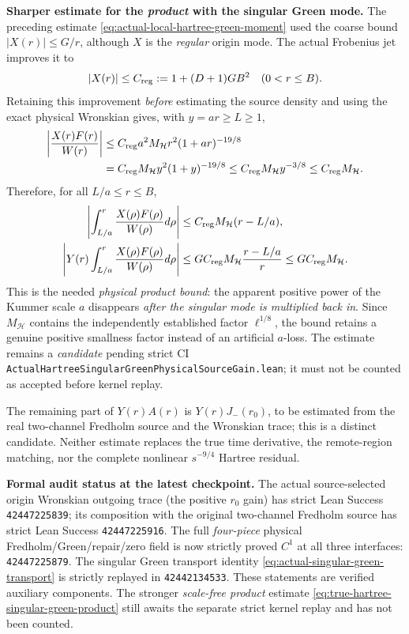 \documentclass[11pt]{amsart}
\newcommand{\HH}{\mathcal H}
\begin{document}
\medskip
\noindent\textbf{Sharper estimate for the \emph{product} with the singular Green mode.}
The preceding estimate \eqref{eq:actual-local-hartree-green-moment}
used the coarse bound $|X(r)|\le G/r$, although $X$ is the
\emph{regular} origin mode. The actual Frobenius jet improves it to
\[
 |X(r)|\le C_{\rm reg}:=1+(D+1)G B^2
 \quad(0<r\le B).
\]
Retaining this improvement \emph{before} estimating the source
density and using the exact physical Wronskian gives, with $y=ar\ge L\ge1$,
\begin{align*}
 \left|\frac{X(r)F(r)}{W(r)}\right|
 &\le C_{\rm reg}a^2 M_{\HH}r^2(1+ar)^{-19/8}\\
 &=C_{\rm reg}M_{\HH}y^2(1+y)^{-19/8}
 \le C_{\rm reg}M_{\HH}y^{-3/8}
 \le C_{\rm reg}M_{\HH}.
\end{align*}
Therefore, for all $L/a\le r\le B$,
\begin{align}
 \left|\int_{L/a}^r\frac{X(\rho)F(\rho)}{W(\rho)}d\rho\right|
 &\le C_{\rm reg}M_{\HH}(r-L/a),\\
 \left|Y(r)\int_{L/a}^r
     \frac{X(\rho)F(\rho)}{W(\rho)}d\rho\right|
 &\le G C_{\rm reg}M_{\HH}\frac{r-L/a}{r}
 \le G C_{\rm reg}M_{\HH}.
 \label{eq:true-hartree-singular-green-product}
\end{align}
This is the needed \emph{physical product bound}: the apparent positive
power of the Kummer scale $a$ disappears \emph{after the singular mode
is multiplied back in}. Since $M_{\HH}$ contains the independently
established factor $\ell^{1/8}$, the bound retains a genuine
positive smallness factor instead of an artificial $a$-loss.
The estimate remains a \emph{candidate} pending strict CI
\texttt{ActualHartreeSingularGreenPhysicalSourceGain.lean};
it must not be counted as accepted before kernel replay.

The remaining part of $Y(r)A(r)$ is $Y(r)J_-(r_0)$,
to be estimated from the real two-channel Fredholm source and the
Wronskian trace; this is a distinct candidate. Neither estimate
replaces the true time derivative, the remote-region matching, nor
the complete nonlinear $s^{-9/4}$ Hartree residual.


\medskip
\noindent\textbf{Formal audit status at the latest checkpoint.}
The actual source-selected origin Wronskian outgoing trace
(the positive $r_0$ gain) has strict Lean Success
\texttt{42447225839}; its composition with the original two-channel
Fredholm source has strict Lean Success \texttt{42447225916}.
The full \emph{four-piece} physical Fredholm/Green/repair/zero
field is now strictly proved $C^1$ at all three interfaces:
\texttt{42447225879}. The singular Green transport identity
\eqref{eq:actual-singular-green-transport} is strictly replayed in
\texttt{42442134533}. These statements are verified auxiliary
components. The stronger \emph{scale-free product} estimate
\eqref{eq:true-hartree-singular-green-product} still awaits the
separate strict kernel replay and has not been counted.
\end{document}
